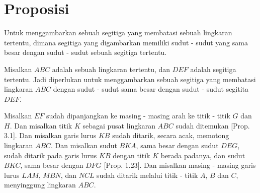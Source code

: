 \documentclass[a4paper]{book}
\begin{document}
\section*{\centering Proposisi \thesection}
Untuk menggambarkan sebuah segitiga yang membatasi sebuah lingkaran
tertentu, dimana segitiga yang digambarkan memiliki sudut - sudut 
yang sama besar dengan sudut - sudut sebuah segitiga tertentu.
\begin{center}
\end{center}
Misalkan $ABC$ adalah sebuah lingkaran tertentu, dan $DEF$ adalah 
segitiga tertentu. Jadi diperlukan untuk menggambarkan sebuah 
segitiga yang membatasi lingkaran $ABC$ dengan sudut -  sudut sama
besar dengan sudut - sudut segitita $DEF$.

Misalkan $EF$ sudah dipanjangkan ke masing - masing arah ke titik -
titik $G$ dan $H$. Dan misalkan titik $K$ sebagai pusat lingkaran 
$ABC$ sudah ditemukan [Prop. 3.1]. Dan misalkan garis lurus $KB$
sudah ditarik, secara acak, memotong lingkaran $ABC$. Dan misalkan
sudut $BKA$, sama besar dengan sudut $DEG$, sudah ditarik pada garis
lurus $KB$ dengan titik $K$ berada padanya, dan sudut $BKC$, sama
besar dengan $DFG$ [Prop. 1.23]. Dan misalkan masing - masing 
garis lurus $LAM$, $MBN$, dan $NCL$ sudah ditarik melalui titik - 
titik $A$, $B$ dan $C$, menyinggung lingkaran $ABC$.
\end{document}
